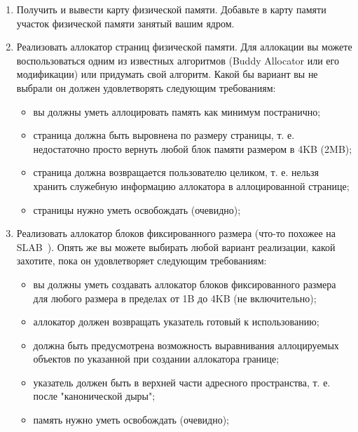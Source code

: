 \begin{enumerate}
  \item Получить и вывести карту физической памяти. Добавьте в карту памяти
        участок физической памяти занятый вашим ядром.
  \item Реализовать аллокатор страниц физической памяти. Для аллокации вы можете
        воспользоваться одним из известных алгоритмов (Buddy Allocator или его
        модификации) или придумать свой алгоритм. Какой бы вариант вы не
        выбрали он должен удовлетворять следующим требованиям:
        \begin{itemize}
          \item вы должны уметь аллоцировать память как минимум постранично;
          \item страница должна быть выровнена по размеру страницы, т. е.
                недостаточно просто вернуть любой блок памяти размером в 4KB
                (2MB);
          \item страница должна возвращается пользователю целиком, т. е. нельзя
                хранить служебную информацию аллокатора в аллоцированной
                странице;
          \item страницы нужно уметь освобождать (очевидно);
        \end{itemize}
  \item Реализовать аллокатор блоков фиксированного размера (что-то похожее на
        SLAB~\cite{Bonwick:SLAB}). Опять же вы можете выбирать любой вариант
        реализации, какой захотите, пока он удовлетворяет следующим требованиям:
        \begin{itemize}
          \item вы должны уметь создавать аллокатор блоков фиксированного
                размера для любого размера в пределах от 1B до 4KB
                (не включительно);
          \item аллокатор должен возвращать указатель готовый к использованию;
          \item должна быть предусмотрена возможность выравнивания аллоцируемых
                объектов по указанной при создании аллокатора границе;
          \item указатель должен быть в верхней части адресного пространства,
                т. е. после "канонической дыры";
          \item память нужно уметь освобождать (очевидно);
        \end{itemize}
\end{enumerate}

